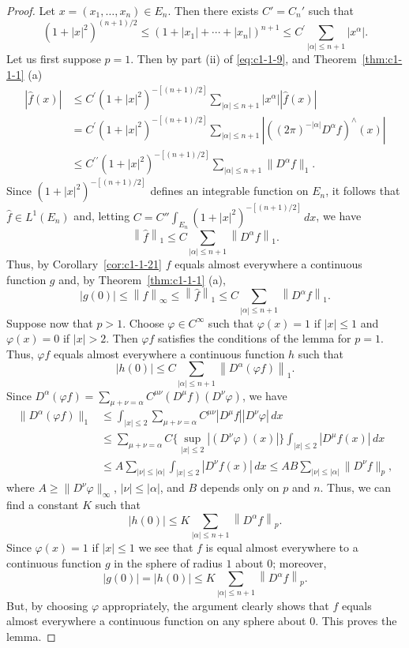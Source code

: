 \begin{proof}
Let $x = (x_{1}, \ldots, x_{n}) \in E_{n}$. Then there exists
$C' = C_{n}'$ such that
\[
(1+|x|^{2})^{(n+1)/2}\leq(1+|x_{1}|+\cdots+|x_{n}|)^{n+1}\leq C^{\prime}\sum_{|\alpha|\leq n+1}|x^{\alpha}|.
\]
Let us first suppose $p = 1$. Then by part (ii) of \eqref{eq:c1-1-9}, and
Theorem~\ref{thm:c1-1-1} (a)
\begin{align*}
|\hat{f}(x)|
&\leq C^{\prime}(1+|x|^{2})^{-[(n+1)/2]}\sum_{|\alpha|\leq n+1}|x^{\alpha}||\hat{f}(x)|\\
&=C^{\prime}(1+|x|^{2})^{-[(n+1)/2]}\sum_{|\alpha|\leq n+1}|((2\pi)^{-|\alpha|}D^{\alpha}f)^{\wedge}(x)|\\
&\leq C^{\prime\prime}(1+|x|^{2})^{-[(n+1)/2]}\sum_{|\alpha|\leq n+1}\|D^{\alpha}f\|_{1}.
\end{align*}
Since $(1 + |x|^{2})^{-[(n+1)/2]}$ defines an integrable function on $E_{n}$,
it follows that $\hat{f} \in L^{1}(E_{n})$ and, letting
$C = C'' \int_{E_{n}} (1 + |x|^{2})^{-[(n+1)/2]} \, dx$, we have
\[
\left\|\hat{f}\right\|_{1}\leq C\sum_{|\alpha|\leq n+1}\left\|D^{\alpha}f\right\|_{1}.
\]
Thus, by Corollary~\ref{cor:c1-1-21} $f$ equals almost everywhere a continuous
function $g$ and, by Theorem~\ref{thm:c1-1-1} (a),
\[
\left|g(0)\right|\leq\left\|f\right\|_{\infty}\leq\left\|\hat{f}\right\|_{1}
\leq C\sum_{|\alpha|\leq n+1}\left\|D^{\alpha}f\right\|_{1}.
\]
Suppose now that $p > 1$. Choose $\varphi \in C^{\infty}$ such that
$\varphi(x) = 1$ if $|x| \leq 1$ and $\varphi(x) = 0$ if $|x| > 2$. Then
$\varphi f$ satisfies the conditions of the lemma for $p = 1$. Thus,
$\varphi f$ equals almost everywhere a continuous function $h$ such that
\[
\left|h(0)\right|\leq C\sum_{|\alpha|\leq n+1}\left\|D^{\alpha}(\varphi f)\right\|_{1}.
\]
Since $D^{\alpha}(\varphi f) = \sum_{\mu + \nu = \alpha} C^{\mu\nu}(D^{\mu}f)(D^{\nu}\varphi)$,
we have
\begin{align*}
\|D^{\alpha}(\varphi f)\|_{1}
&\leq\int_{|x|\leq2}\sum_{\mu+\nu=\alpha}C^{\mu\nu}|D^{\mu}f||D^{\nu}\varphi|\,dx\\
&\leq\sum_{\mu+\nu=\alpha}C\Biggl\{\sup_{|x|\leq2}|(D^{\nu}\varphi)(x)|\Biggr\}\int_{|x|\leq2}|D^{\mu}f(x)|\,dx\\
&\leq A\sum_{|\nu|\leq|\alpha|}\int_{|x|\leq2}|D^{\nu}f(x)|\,dx
\leq AB\sum_{|\nu|\leq|\alpha|}\|D^{\nu}f\|_{p},
\end{align*}
where $A \geq \|D^{\nu}\varphi\|_{\infty}$, $|\nu| \leq |\alpha|$, and $B$
depends only on $p$ and $n$. Thus, we can find a constant $K$ such that
\[
\left|h(0)\right|\leq K\sum_{|\alpha|\leq n+1}\left\|D^{\alpha}f\right\|_{p}.
\]
Since $\varphi(x) = 1$ if $|x| \leq 1$ we see that $f$ is equal almost
everywhere to a continuous function $g$ in the sphere of radius $1$ about $0$;
moreover,
\[
\left|g(0)\right|=\left|h(0)\right|\leq K\sum_{|\alpha|\leq n+1}\left\|D^{\alpha}f\right\|_{p}.
\]
But, by choosing $\varphi$ appropriately, the argument clearly shows that $f$
equals almost everywhere a continuous function on any sphere about $0$. This
proves the lemma.
\end{proof}


